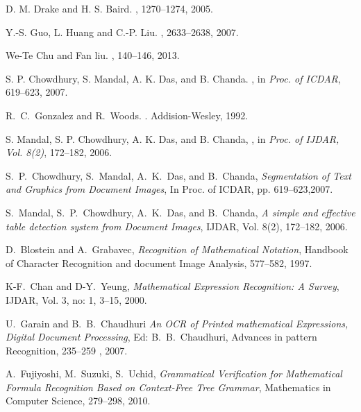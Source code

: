 \documentclass[oneside,a4paper,12pt]{book}
\begin{document}
\begin{thebibliography}{1}
\newblock D. M. Drake and H. S. Baird.
, 1270--1274, 2005.

\newblock Y.-S. Guo, L. Huang and C.-P. Liu.
, 2633--2638, 2007.

\newblock We-Te Chu and Fan liu.
, 140--146, 2013.

S. P. Chowdhury, S. Mandal, A. K. Das, and B. Chanda.
,
\newblock in {\em Proc. of ICDAR}, 619--623, 2007.

R.~C.~Gonzalez and R.~Woods.
.
\newblock Addision-Wesley, 1992.

S. Mandal, S. P. Chowdhury, A. K. Das, and B. Chanda,
,
\newblock in {\em Proc. of IJDAR, Vol. 8(2)}, 172--182, 2006.

 S.~P.~Chowdhury, S.~Mandal, A.~K.~Das, and
B.~Chanda, \emph{Segmentation of Text and Graphics from Document
Images}, In Proc. of ICDAR, pp. 619–623,2007.

 S.~Mandal, S.~P.~Chowdhury, A.~K.~Das, and
B.~Chanda, \emph{A simple and effective table detection system
from Document Images}, IJDAR, Vol. 8(2), 172–182, 2006.

 D.~Blostein and A.~Grabavec,
\emph{Recognition of Mathematical Notation}, Handbook of
Character Recognition and document Image Analysis, 577--582,
1997.
 
 K-F.~Chan and D-Y.~Yeung, \emph{Mathematical
Expression Recognition: A Survey}, IJDAR, Vol. 3, no: 1, 3–15,
2000.

 U.~Garain and B.~B.~Chaudhuri \emph{An OCR
of Printed mathematical Expressions, Digital Document
Processing}, Ed: B.~B.~Chaudhuri, Advances in pattern
Recognition, 235–259 , 2007.

A.~Fujiyoshi, M.~Suzuki, S.~Uchid,
 \emph{Grammatical Verification for Mathematical Formula Recognition Based on Context-Free Tree Grammar},
 Mathematics in Computer Science, 279--298, 2010.
 

\end{thebibliography}
\end{document}
